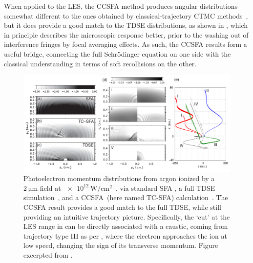 When applied to the LES, the CCSFA method produces angular distributions somewhat different to the ones obtained by classical-trajectory CTMC methods~\cite{ yan_TCSFA_caustics}, but it does provide a good match to the TDSE distributions, as shown in , which in principle describes the microscopic response better, prior to the washing out of interference fringes by focal averaging effects. As such, the CCSFA results form a useful bridge, connecting the full Schrödinger equation on one side with the classical understanding in terms of soft recollisions on the other.




\begin{figure}[htb]
  \centering
  \subfigure{\label{f6-yan-original-figure-a}}
  \subfigure{\label{f6-yan-original-figure-b}}
  \subfigure{\label{f6-yan-original-figure-c}}
  \subfigure{\label{f6-yan-original-figure-d}}
  \subfigure{\label{f6-yan-original-figure-e}}
  \includegraphics[width=\textwidth]{6-LES/Figures/figure6L.png}
  \caption[
  CCSFA analysis of the Low-Energy Structures, as performed by T.-M. Yan~et~al.
  ]{
  Photoelectron momentum distributions from argon ionized by a $\SI{2}{\micro\meter}$ field at $\SI{e12}{\watt/\centi\meter^2}$~\cite{ yan_TCSFA_caustics}, via standard SFA \protect{}, a full TDSE simulation~\protect{}, and a CCSFA~(here named TC-SFA) calculation~\protect{}. The CCSFA result provides a good match to the full TDSE, while still providing an intuitive trajectory picture. Specifically, the `cut' at the LES range in \protect{} can be directly associated with a caustic, coming from trajectory type III as per \protect{}, where the electron approaches the ion at low speed, changing the sign of its transverse momentum.
  Figure excerpted from .
  }
\label{f6-yan-original-figure}
\end{figure}





